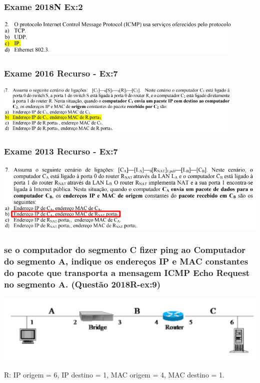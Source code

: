 \documentclass{article}
\begin{document}
\subsubsection{Exame 2018N Ex:2}
\begin{center}
    \includegraphics[width=12cm]{images/RCOM44.png}
\end{center}

\subsubsection{Exame 2016 Recurso - Ex:7}
\begin{center}            
    \includegraphics[width=12cm]{images/RCOM50.png}
\end{center}
\subsubsection{Exame 2013 Recurso - Ex:7}
\begin{center}            
    \includegraphics[width=14cm]{images/RCOM53.png}
\end{center}

\subsubsection{se o computador do segmento C fizer ping ao Computador do segmento A, indique os endereços IP e MAC constantes do pacote que transporta a mensagem ICMP Echo Request no segmento A. (Questão 2018R-ex:9)}
\begin{center}
    \includegraphics[width=15cm]{images/RCOM49.png}
\end{center}
R: IP origem = 6, IP destino = 1, MAC origem = 4, MAC destino = 1.\newline
\end{document}
